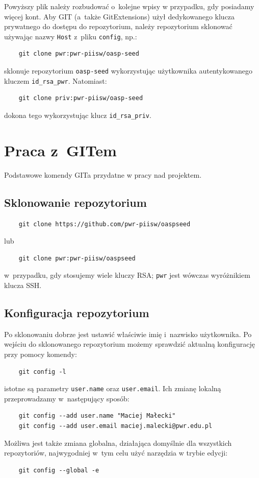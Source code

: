 \documentclass[12pt]{article}
\begin{document}
        Powyższy plik należy rozbudować o~kolejne wpisy w przypadku, gdy posiadamy więcej kont. Aby GIT (a~także GitExtensions) użył dedykowanego klucza prywatnego do dostępu do repozytorium, należy repozytorium sklonować używając nazwy \texttt{Host} z~pliku \texttt{config}, np.:
        \begin{verbatim}
    git clone pwr:pwr-piisw/oasp-seed
        \end{verbatim}
        sklonuje repozytorium \texttt{oasp-seed} wykorzystując użytkownika autentykowanego kluczem \texttt{id\_rsa\_pwr}. Natomiast:
        \begin{verbatim}
    git clone priv:pwr-piisw/oasp-seed
        \end{verbatim}
        dokona tego wykorzystując klucz \texttt{id\_rsa\_priv}.

    \section*{Praca z~GITem}
        Podstawowe komendy GITa przydatne w pracy nad projektem.
        \subsection*{Sklonowanie repozytorium}
        \begin{verbatim}
    git clone https://github.com/pwr-piisw/oaspseed
        \end{verbatim}
        lub
        \begin{verbatim}
    git clone pwr:pwr-piisw/oaspseed
        \end{verbatim}
        w~przypadku, gdy stosujemy wiele kluczy RSA; \texttt{pwr} jest wówczas wyróżnikiem klucza SSH.

        \subsection*{Konfiguracja repozytorium}
        Po sklonowaniu dobrze jest ustawić właściwie imię i~nazwisko użytkownika. Po wejściu do sklonowanego repozytorium możemy sprawdzić aktualną konfigurację przy pomocy komendy:
        \begin{verbatim}
    git config -l
        \end{verbatim}
        istotne są parametry \texttt{user.name} oraz \texttt{user.email}. Ich zmianę lokalną przeprowadzamy w~następujący sposób:
        \begin{verbatim}
    git config --add user.name "Maciej Małecki"
    git config --add user.email maciej.malecki@pwr.edu.pl
        \end{verbatim}
        Możliwa jest także zmiana globalna, działająca domyślnie dla wszystkich repozytoriów, najwygodniej w~tym celu użyć narzędzia w trybie edycji:
        \begin{verbatim}
    git config --global -e
        \end{verbatim}
\end{document}
